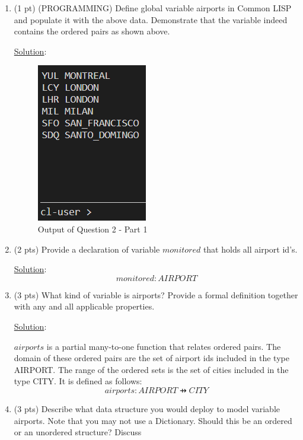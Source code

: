 \documentclass[12pt]{article}
\begin{document}
\begin{spacing}{1.5}
	\begin{enumerate}
		\newpage
		\item (1 pt) (PROGRAMMING) Define global variable airports in Common LISP and
		      populate it with the above data. Demonstrate that the variable indeed contains the
		      ordered pairs as shown above.
		      
		      \underline{Solution}:
		      
		      
		      \begin{figure}[htp]
		      	\centering
		      	\includegraphics{static/airports-2-1.PNG}
		      	\caption{Output of Question 2 - Part 1}
		      \end{figure}
		      \newpage
		\item (2 pts) Provide a declaration of variable $monitored$ that holds all airport id's.
		              
		      \underline{Solution}:
		      $$monitored : AIRPORT$$
		              
		\item (3 pts) What kind of variable is airports? Provide a formal definition together with
		      any and all applicable properties.
		      
		      \underline{Solution}:
		              
		      $airports$ is a partial many-to-one function that relates ordered pairs. The domain of these ordered pairs are the set of airport ids included in the type AIRPORT. The range of the ordered sets is the set of cities included in the type CITY. It is defined as follows:
		      $$airports : AIRPORT \pfun CITY$$
		      \newpage
		\item (3 pts) Describe what data structure you would deploy to model variable airports.
		      Note that you may not use a Dictionary. Should this be an ordered or an unordered
		      structure? Discuss
		      

\end{enumerate}
\end{spacing}
\end{document}
